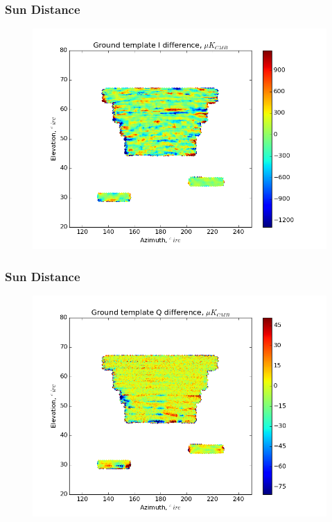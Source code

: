 \documentclass{beamer}
\begin{document}
\begin{frame}
\frametitle{Sun Distance}
\begin{figure}
\includegraphics[width=0.9\linewidth]{dI_gt_SUN_DIST.png}
\end{figure}
\end{frame}

\begin{frame}
\frametitle{Sun Distance}
\begin{figure}
\includegraphics[width=0.9\linewidth]{dQ_gt_SUN_DIST.png}
\end{figure}
\end{frame}
\end{document}
